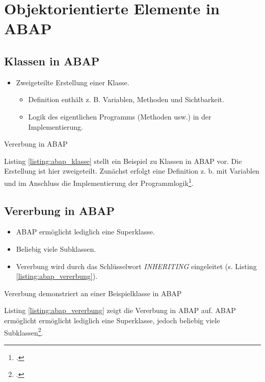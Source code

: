 \section{Objektorientierte Elemente in ABAP}

\subsection{Klassen in ABAP}
\begin{itemize}
  \item Zweigeteilte Erstellung einer Klasse.
  \begin{itemize}
    \item Definition enthält z. B. Variablen, Methoden und Sichtbarkeit.
    \item Logik des eigentlichen Programms (Methoden usw.) in der Implementierung.
  \end{itemize}
\end{itemize}

\begin{listing}[ht]{}
  \caption{Vererbung in ABAP}
  \label{listing:abap_klasse}
\end{listing}
Listing \ref{listing:abap_klasse} stellt ein Beispiel zu Klassen in ABAP vor. Die Erstellung ist hier zweigeteilt. Zunächst erfolgt eine Definition z. b. mit Variablen und im Anschluss die Implementierung der Programmlogik\footcite[Vgl.][S. 233]{kellerABAPObjectsIntroduction2002}. 

\subsection{Vererbung in ABAP}
\begin{itemize}
  \item ABAP ermöglicht lediglich eine Superklasse.
  \item Beliebig viele Subklassen. 
  \item Vererbung wird durch das Schlüsselwort 
  \textit{INHERITING} eingeleitet (s. Listing \ref{listing:abap_vererbung}).
\end{itemize}

\begin{listing}[ht]{}
  \caption{Vererbung demonstriert an einer Beispielklasse in ABAP}
  \label{listing:abap_vererbung}
\end{listing}
Listing \ref{listing:abap_vererbung} zeigt die Vererbung in ABAP auf. ABAP ermöglicht ermöglicht lediglich eine Superklasse, jedoch beliebig viele Subklassen\footcite[Vgl.][S. 266 ff.]{kellerABAPObjectsIntroduction2002}.

